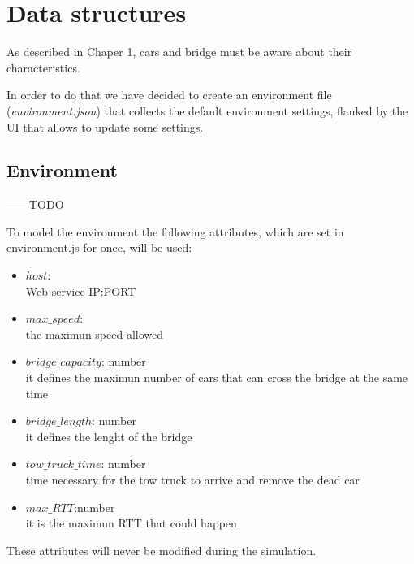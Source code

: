 \section{Data structures}

As described in Chaper 1, cars and bridge must be aware about their characteristics.

In order to do that we have decided to create an environment file 
(\textit{environment.json}) that collects the default environment settings,
flanked by the UI that allows to update some settings.   


\subsection{Environment}
------TODO

To model the environment the following attributes, which are set in environment.js for once, will be used:
\begin{itemize}
    \item $host$:\\ Web service IP:PORT
    \item $max\_speed$:\\ the maximun speed allowed
    \item $bridge\_capacity$: number\\ it defines the maximun number of cars that can cross the bridge
    at the same time
    \item $bridge\_length$: number\\ it defines the lenght of the bridge
    \item $tow\_truck\_time$: number\\ time necessary for the tow truck to arrive and remove the dead car
    \item $max\_RTT$:number\\ it is the maximun RTT that could happen
\end{itemize}

These attributes will never be modified during the simulation.

